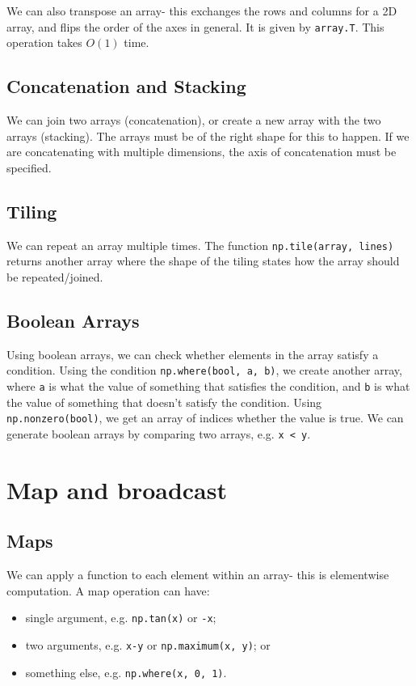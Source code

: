\documentclass[a4paper, openany]{memoir}
\begin{document}
    We can also transpose an array- this exchanges the rows and columns for a 2D array, and flips the order of the axes in general. It is given by \texttt{array.T}. This operation takes $O(1)$ time.

    \subsection{Concatenation and Stacking}
    We can join two arrays (concatenation), or create a new array with the two arrays (stacking). The arrays must be of the right shape for this to happen. If we are concatenating with multiple dimensions, the axis of concatenation must be specified.

    \subsection{Tiling}
    We can repeat an array multiple times. The function \texttt{np.tile(array, lines)} returns another array where the shape of the tiling states how the array should be repeated/joined.

    \subsection{Boolean Arrays} Using boolean arrays, we can check whether elements in the array satisfy a condition. Using the condition \texttt{np.where(bool, a, b)}, we create another array, where \texttt{a} is what the value of something that satisfies the condition, and \texttt{b} is what the value of something that doesn't satisfy the condition. Using \texttt{np.nonzero(bool)}, we get an array of indices whether the value is true. We can generate boolean arrays by comparing two arrays, e.g. \texttt{x < y}.
    \newpage

    \section{Map and broadcast}
    \subsection{Maps}
    We can apply a function to each element within an array- this is elementwise computation. A map operation can have:
    \begin{itemize}
        \item single argument, e.g. \texttt{np.tan(x)} or \texttt{-x};
        \item two arguments, e.g. \texttt{x-y} or \texttt{np.maximum(x, y)}; or
        \item something else, e.g. \texttt{np.where(x, 0, 1)}.
    \end{itemize}
\end{document}
